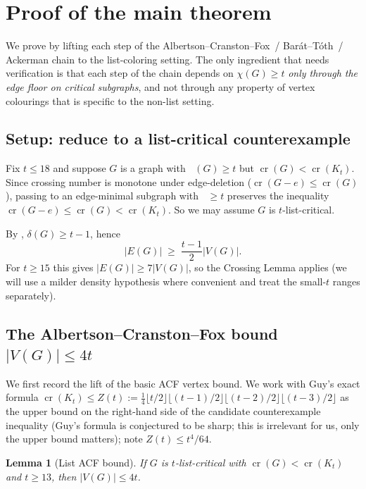 \documentclass[11pt,a4paper]{article}
\newtheorem{lemma}[theorem]{Lemma}
\theoremstyle{definition}
\DeclareMathOperator{\crN}{cr}
\DeclareMathOperator{\chl}{\chi_{\ell}}
\begin{document}
\section{Proof of the main theorem}\label{sec:main}

We prove  by lifting each step of the
Albertson--Cranston--Fox~/ Bar\'at--T\'oth~/ Ackerman chain to the
list-coloring setting. The only ingredient that needs verification
is that each step of the chain depends on $\chi(G) \ge t$
\emph{only through the edge floor on critical subgraphs}, and not
through any property of vertex colourings that is specific to the
non-list setting.

\subsection{Setup: reduce to a list-critical counterexample}

Fix $t \le 18$ and suppose $G$ is a graph with $\chl(G) \ge t$ but
$\crN(G) < \crN(K_t)$. Since crossing number is monotone under
edge-deletion ($\crN(G - e) \le \crN(G)$), passing to an edge-minimal
subgraph with $\chl \ge t$ preserves the inequality
$\crN(G - e) \le \crN(G) < \crN(K_t)$. So we may assume $G$ is
$t$-list-critical.

By , $\delta(G) \ge t - 1$, hence
\begin{equation}\label{eq:edge-floor}
   |E(G)| \;\ge\; \frac{t - 1}{2} |V(G)|.
\end{equation}
For $t \ge 15$ this gives $|E(G)| \ge 7 |V(G)|$, so the
Crossing Lemma  applies (we will use a milder
density hypothesis where convenient and treat the small-$t$ ranges
separately).

\subsection{The Albertson--Cranston--Fox bound $|V(G)| \le 4t$}

We first record the lift of the basic ACF vertex bound. We work
with Guy's exact formula
$\crN(K_t) \le Z(t) := \tfrac{1}{4} \lfloor t/2 \rfloor
\lfloor (t-1)/2 \rfloor \lfloor (t-2)/2 \rfloor \lfloor (t-3)/2 \rfloor$
as the upper bound on the right-hand side of the candidate
counterexample inequality (Guy's formula is conjectured to be
sharp; this is irrelevant for us, only the upper bound matters);
note $Z(t) \le t^4 / 64$.

\begin{lemma}[List ACF bound]\label{lem:list-acf}
If $G$ is $t$-list-critical with $\crN(G) < \crN(K_t)$ and
$t \ge 13$, then $|V(G)| \le 4t$.
\end{lemma}
\end{document}
